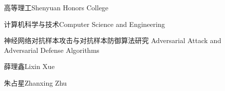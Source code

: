 
\school
{高等理工}{Shenyuan Honors College}

\major
{计算机科学与技术}{Computer Science and Engineering}

\thesistitle
{神经网络对抗样本攻击与对抗样本防御算法研究}
{}
{Adversarial Attack and Adversarial Defense Algorithms}
{}

\thesisauthor
{薛理鑫}{Lixin Xue}

\teacher
{朱占星}{Zhanxing Zhu}



\thesisend{}{}{}


\ckeyword{}

\ekeyword{}
